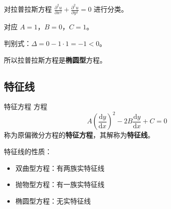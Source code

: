 \begin{lizi}{}{}
对拉普拉斯方程 $\frac{\partial^2 u}{\partial x^2} + \frac{\partial^2 u}{\partial y^2} = 0$ 进行分类。

\begin{jie}
    对应 $A = 1$，$B = 0$，$C = 1$。
    
    判别式：$\Delta = 0 - 1 \cdot 1 = -1 < 0$。
    
    所以拉普拉斯方程是\textbf{椭圆型}方程。
\end{jie}
\end{lizi}

\subsection{特征线}

\begin{dingliyi}{特征方程}{}
方程
\begin{equation}
    A\left(\frac{\mathrm{d}y}{\mathrm{d}x}\right)^2 - 2B\frac{\mathrm{d}y}{\mathrm{d}x} + C = 0
\end{equation}
称为原偏微分方程的\textbf{特征方程}，其解称为\textbf{特征线}。
\end{dingliyi}

特征线的性质：
\begin{itemize}
    \item 双曲型方程：有两族实特征线
    \item 抛物型方程：有一族实特征线
    \item 椭圆型方程：无实特征线
\end{itemize}

